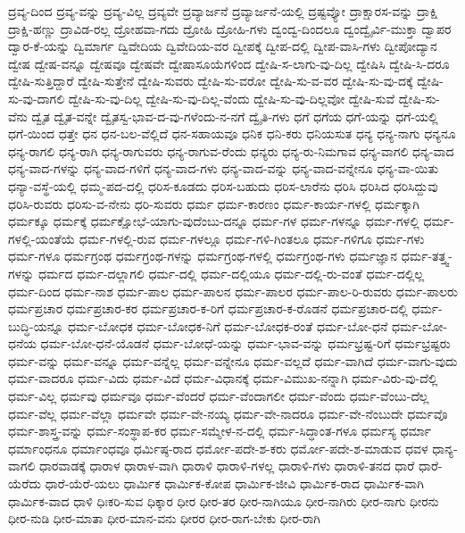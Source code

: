 {ದ್ರವ್ಯ-ದಿಂದ
ದ್ರವ್ಯ-ವನ್ನು
ದ್ರವ್ಯ-ವಿಲ್ಲ
ದ್ರವ್ಯವೇ
ದ್ರವ್ಯಾರ್ಜನೆ
ದ್ರವ್ಯಾರ್ಜನೆ-ಯಲ್ಲಿ
ದ್ರಷ್ಟವ್ಯೋ
ದ್ರಾಕ್ಷಾರಸ-ವನ್ನು
ದ್ರಾಕ್ಷಿ
ದ್ರಾಕ್ಷಿ-ಹಣ್ಣು
ದ್ರಾವಿಡ-ರಲ್ಲ
ದ್ರೋಹವಾ-ಗದು
ದ್ರೋಹಿ
ದ್ರೋಹಿ-ಗಳು
ದ್ವಂದ್ವ-ದಿಂದಲೂ
ದ್ವಂದ್ವೈರ್ವಿ-ಮುಕ್ತಾ
ದ್ವಾಪರ
ದ್ವಾರ-ಕೆ-ಯನ್ನು
ದ್ವಿಮಾರ್ಗ
ದ್ವಿವೇದಿಯ
ದ್ವಿವೇದಿಯ-ವರ
ದ್ವೀಪಕ್ಕೆ
ದ್ವೀಪ-ದಲ್ಲಿ
ದ್ವೀಪ-ವಾಸಿ-ಗಳು
ದ್ವೀಪೋದ್ಯಾನ
ದ್ವೇಷ
ದ್ವೇಷ-ವನ್ನೂ
ದ್ವೇಷವೂ
ದ್ವೇಷವೇ
ದ್ವೇಷಾಸೂಯೆಗಳಿಂದ
ದ್ವೇಷಿ-ಸ-ಲಾಗು-ವು-ದಿಲ್ಲ
ದ್ವೇಷಿಸಿ
ದ್ವೇಷಿ-ಸಿ-ದರೂ
ದ್ವೇಷಿ-ಸುತ್ತಿದ್ದಾರೆ
ದ್ವೇಷಿ-ಸುತ್ತೇನೆ
ದ್ವೇಷಿ-ಸುವರು
ದ್ವೇಷಿ-ಸು-ವರೋ
ದ್ವೇಷಿ-ಸು-ವ-ವರ
ದ್ವೇಷಿ-ಸು-ವು-ದಕ್ಕೆ
ದ್ವೇಷಿ-ಸು-ವು-ದಾಗಲಿ
ದ್ವೇಷಿ-ಸು-ವು-ದಿಲ್ಲ
ದ್ವೇಷಿ-ಸು-ವು-ದಿಲ್ಲ-ವೆಂದು
ದ್ವೇಷಿ-ಸು-ವು-ದಿಲ್ಲವೋ
ದ್ವೇಷಿ-ಸುವೆ
ದ್ವೇಷಿ-ಸು-ವೆನು
ದ್ವೈತ
ದ್ವೈತ-ವನ್ನೇ
ದ್ವೈತಸ್ವ-ಭಾವ-ದ-ವು-ಗಳೆಂದು-ನ-ನಗೆ
ದ್ವೈತಿ-ಗಳು
ಧಗೆ
ಧಗೆಯ
ಧಗೆ-ಯನ್ನು
ಧಗೆ-ಯಲ್ಲಿ
ಧಗೆ-ಯಿಂದ
ಧತ್ತೇ
ಧನ
ಧನ-ಬಲ-ವೆಲ್ಲಿದೆ
ಧನ-ಸಹಾಯವೂ
ಧನಿಕ
ಧನಿ-ಕರು
ಧನಿಯಸುತ
ಧನ್ಯ
ಧನ್ಯ-ನಾಗು
ಧನ್ಯನೂ
ಧನ್ಯ-ರಾಗಲಿ
ಧನ್ಯ-ರಾಗಿ
ಧನ್ಯ-ರಾಗುವರು
ಧನ್ಯ-ರಾಗುವ-ರೆಂದು
ಧನ್ಯರು
ಧನ್ಯ-ರು-ನಿಮಗಾವ
ಧನ್ಯ-ವಾಗಲಿ
ಧನ್ಯ-ವಾದ
ಧನ್ಯ-ವಾದ-ಗಳನ್ನು
ಧನ್ಯ-ವಾದ-ಗಳಿಗೆ
ಧನ್ಯ-ವಾದ-ಗಳು
ಧನ್ಯ-ವಾದ-ವನ್ನು
ಧನ್ಯ-ವಾದ-ವನ್ನೇನೂ
ಧನ್ಯ-ವಾ-ಯಿತು
ಧನ್ಯಾ-ವಸ್ಥೆ-ಯಲ್ಲಿ
ಧಮ್ಮ-ಪದ-ದಲ್ಲಿ
ಧರಿಸ-ಕೂಡದು
ಧರಿಸ-ಬಹುದು
ಧರಿಸ-ಲಾರೆನು
ಧರಿಸಿ
ಧರಿಸಿದ
ಧರಿಸಿದ್ದುವು
ಧರಿಸಿ-ರುವರು
ಧರಿಸು-ವ-ನೇನು
ಧರಿ-ಸುವರು
ಧರ್ಮ
ಧರ್ಮ-ಕಾರಣಂ
ಧರ್ಮ-ಕಾರ್ಯ-ಗಳಲ್ಲಿ
ಧರ್ಮಕ್ಕಾಗಿ
ಧರ್ಮಕ್ಕೂ
ಧರ್ಮಕ್ಕೆ
ಧರ್ಮಕ್ಷೋಭೆ-ಯಾಗು-ವುದೆಂಬು-ದನ್ನೂ
ಧರ್ಮ-ಗಳ
ಧರ್ಮ-ಗಳನ್ನೂ
ಧರ್ಮ-ಗಳಲ್ಲಿ
ಧರ್ಮ-ಗಳಲ್ಲಿ-ಯಂತೆಯೆ
ಧರ್ಮ-ಗಳಲ್ಲಿ-ರುವ
ಧರ್ಮ-ಗಳಲ್ಲೂ
ಧರ್ಮ-ಗಳಿ-ಗಿಂತಲೂ
ಧರ್ಮ-ಗಳಿಗೂ
ಧರ್ಮ-ಗಳು
ಧರ್ಮ-ಗಳೂ
ಧರ್ಮಗ್ರಂಥ
ಧರ್ಮಗ್ರಂಥ-ಗಳನ್ನು
ಧರ್ಮಗ್ರಂಥ-ಗಳಲ್ಲಿ
ಧರ್ಮಗ್ರಂಥ-ಗಳು
ಧರ್ಮಜ್ಞಾನ
ಧರ್ಮ-ತತ್ತ್ವ-ಗಳನ್ನು
ಧರ್ಮದ
ಧರ್ಮ-ದಲ್ಲಾಗಲಿ
ಧರ್ಮ-ದಲ್ಲಿ
ಧರ್ಮ-ದಲ್ಲಿಯೂ
ಧರ್ಮ-ದಲ್ಲಿ-ರು-ವಂತೆ
ಧರ್ಮ-ದಲ್ಲಿಲ್ಲ
ಧರ್ಮ-ದಿಂದ
ಧರ್ಮ-ನಾಶ
ಧರ್ಮ-ಪಾಲ
ಧರ್ಮ-ಪಾಲನ
ಧರ್ಮ-ಪಾಲರ
ಧರ್ಮ-ಪಾಲ-ರಿ-ರುವರು
ಧರ್ಮ-ಪಾಲರು
ಧರ್ಮಪ್ರಚಾರ
ಧರ್ಮಪ್ರಚಾರ-ಕರ
ಧರ್ಮಪ್ರಚಾರ-ಕ-ರಿಗೆ
ಧರ್ಮಪ್ರಚಾರ-ಕ-ರೊಡನೆ
ಧರ್ಮಪ್ರಚಾರ-ದಲ್ಲಿ
ಧರ್ಮ-ಬುದ್ಧಿ-ಯನ್ನೂ
ಧರ್ಮ-ಬೋಧಕ
ಧರ್ಮ-ಬೋಧಕ-ನಿಗೆ
ಧರ್ಮ-ಬೋಧಕ-ರಂತೆ
ಧರ್ಮ-ಬೋ-ಧನೆ
ಧರ್ಮ-ಬೋ-ಧನೆಯ
ಧರ್ಮ-ಬೋ-ಧನೆ-ಯೊಡನೆ
ಧರ್ಮ-ಬೋಧೆ-ಯನ್ನು
ಧರ್ಮ-ಭಾವ-ವನ್ನು
ಧರ್ಮಭ್ರಷ್ಟ-ರಿಗೆ
ಧರ್ಮಭ್ರಷ್ಟರು
ಧರ್ಮ-ವನ್ನು
ಧರ್ಮ-ವನ್ನೂ
ಧರ್ಮ-ವನ್ನೆಲ್ಲ
ಧರ್ಮ-ವನ್ನೇನೂ
ಧರ್ಮ-ವಲ್ಲದೆ
ಧರ್ಮ-ವಾಗಿದೆ
ಧರ್ಮ-ವಾಗು-ವುದು
ಧರ್ಮ-ವಾದರೂ
ಧರ್ಮ-ವಿದು
ಧರ್ಮ-ವಿದೆ
ಧರ್ಮ-ವಿಧಾನಕ್ಕೆ
ಧರ್ಮ-ವಿಮುಖ-ನನ್ನಾಗಿ
ಧರ್ಮ-ವಿರು-ವು-ದೆಲ್ಲಿ
ಧರ್ಮ-ವಿಲ್ಲ
ಧರ್ಮವು
ಧರ್ಮವೂ
ಧರ್ಮ-ವೆಂದರೆ
ಧರ್ಮ-ವೆಂದಾಗಲೀ
ಧರ್ಮ-ವೆಂದು
ಧರ್ಮ-ವೆಂಬು-ದೆಲ್ಲ
ಧರ್ಮ-ವೆಲ್ಲ
ಧರ್ಮ-ವೆಲ್ಲಾ
ಧರ್ಮವೇ
ಧರ್ಮ-ವೇ-ನಯ್ಯ
ಧರ್ಮ-ವೇ-ನಾದರೂ
ಧರ್ಮ-ವೇ-ನೆಂಬುದೇ
ಧರ್ಮವೊ
ಧರ್ಮ-ಶಾಸ್ತ್ರ-ವನ್ನು
ಧರ್ಮ-ಸಂಸ್ಥಾಪ-ಕರ
ಧರ್ಮ-ಸಮ್ಮೇಳ-ನ-ದಲ್ಲಿ
ಧರ್ಮ-ಸಿದ್ಧಾಂತ-ಗಳೂ
ಧರ್ಮಸ್ಯ
ಧರ್ಮಾ
ಧರ್ಮಾಂಧನೂ
ಧರ್ಮಾಂಧವೂ
ಧರ್ಮಿಷ್ಠ-ರಾದ
ಧರ್ಮೋ-ಪದೇ-ಶ-ಕರು
ಧರ್ಮೋ-ಪದೇ-ಶ-ಮಾಡುವ
ಧವಳ
ಧಾನ್ಯ-ವಾಗಲಿ
ಧಾರವಾಡಕ್ಕೆ
ಧಾರಾಳ
ಧಾರಾಳ-ವಾಗಿ
ಧಾರಾಳಿ
ಧಾರಾಳಿ-ಗಳಲ್ಲ
ಧಾರಾಳಿ-ಗಳು
ಧಾರಾಳಿ-ತನದ
ಧಾರೆ
ಧಾರೆ-ಯೆರೆದು
ಧಾರೆ-ಯೆರೆ-ಯಲು
ಧಾರ್ಮಿಕ
ಧಾರ್ಮಿಕ-ಕೋಪ
ಧಾರ್ಮಿಕ-ಜೀವಿ
ಧಾರ್ಮಿಕ-ರಾದ
ಧಾರ್ಮಿಕ-ವಾಗಿ
ಧಾರ್ಮಿಕ-ವಾದ
ಧಾಳಿ
ಧಿಃಕರಿ-ಸುವ
ಧಿಕ್ಕಾರ
ಧೀರ
ಧೀರ-ತರ
ಧೀರ-ನಾಗಿಯೂ
ಧೀರ-ನಾಗಿರು
ಧೀರ-ನಾಗು
ಧೀರನು
ಧೀರ-ನುಡಿ
ಧೀರ-ಮಾತಾ
ಧೀರ-ಮಾನ-ವನು
ಧೀರರ
ಧೀರ-ರಾಗ-ಬೇಕು
ಧೀರ-ರಾಗಿ
}
